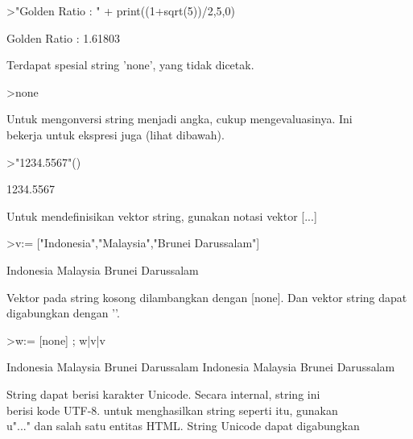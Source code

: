 \documentclass[a4paper,10pt]{article}
\begin{document}
\begin{eulernotebook}
\begin{eulercomment}
\begin{eulercomment}
\begin{eulerprompt}
>"Golden Ratio : " + print((1+sqrt(5))/2,5,0)
\end{eulerprompt}
\begin{euleroutput}
  Golden Ratio : 1.61803
\end{euleroutput}
\begin{eulercomment}
Terdapat spesial string 'none', yang tidak dicetak.
\end{eulercomment}
\begin{eulerprompt}
>none
\end{eulerprompt}
\begin{eulercomment}
Untuk mengonversi string menjadi angka, cukup mengevaluasinya. Ini\\
bekerja untuk ekspresi juga (lihat dibawah).
\end{eulercomment}
\begin{eulerprompt}
>"1234.5567"()
\end{eulerprompt}
\begin{euleroutput}
  1234.5567
\end{euleroutput}
\begin{eulercomment}
Untuk mendefinisikan vektor string, gunakan notasi vektor [...]
\end{eulercomment}
\begin{eulerprompt}
>v:= ["Indonesia","Malaysia","Brunei Darussalam"]
\end{eulerprompt}
\begin{euleroutput}
  Indonesia
  Malaysia
  Brunei Darussalam
\end{euleroutput}
\begin{eulercomment}
Vektor pada string kosong dilambangkan dengan [none]. Dan vektor
string dapat digabungkan dengan '\textbar{}'.
\end{eulercomment}
\begin{eulerprompt}
>w:= [none] ; w|v|v
\end{eulerprompt}
\begin{euleroutput}
  Indonesia
  Malaysia
  Brunei Darussalam
  Indonesia
  Malaysia
  Brunei Darussalam
\end{euleroutput}
\begin{eulercomment}
String dapat berisi karakter Unicode. Secara internal, string ini\\
berisi kode UTF-8. untuk menghasilkan string seperti itu, gunakan\\
u"..." dan salah satu entitas HTML. String Unicode dapat digabungkan\\

\end{eulercomment}
\end{eulercomment}
\end{eulercomment}
\end{eulernotebook}
\end{document}
